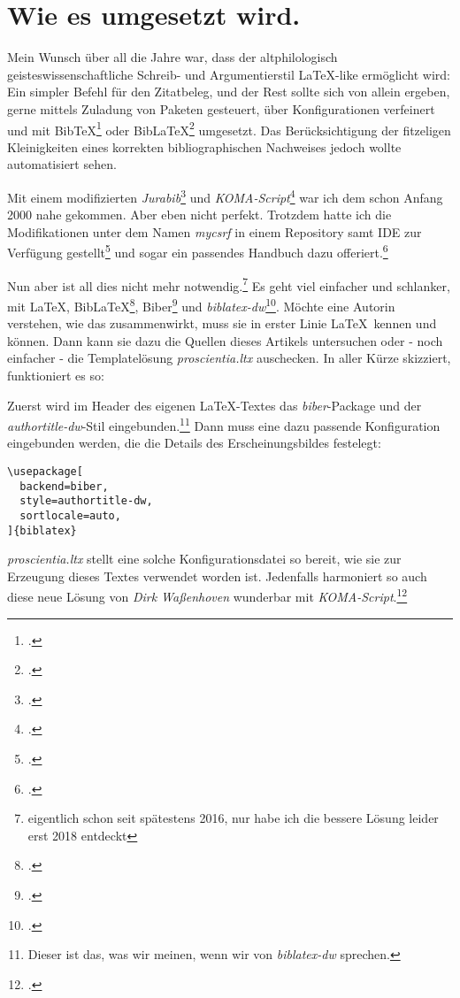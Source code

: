 \section{Wie es umgesetzt wird.}

Mein Wunsch über all die Jahre war, dass der altphilologisch geisteswissenschaftliche Schreib- und Argumentierstil \LaTeX-like ermöglicht wird: Ein simpler Befehl für den Zitatbeleg, und der Rest sollte sich von allein
ergeben, gerne mittels Zuladung von Paketen gesteuert, über Konfigurationen
verfeinert und mit Bib\TeX\footcite[vgl.][]{BibtexOrgDe} oder Bib\LaTeX\footcite[vgl.][]{BibLaTeX2022a} umgesetzt. Das Berücksichtigung der fitzeligen Kleinigkeiten eines korrekten bibliographischen Nachweises jedoch wollte automatisiert sehen.

Mit einem modifizierten \emph{Jurabib}\footcite[vgl.][]{Berger2004a} und \emph{KOMA-Script}\footcite[vgl.][]{Kohm2008a} war ich dem schon Anfang 2000 nahe gekommen. Aber eben nicht perfekt. Trotzdem hatte ich die Modifikationen unter dem Namen \emph{mycsrf} in einem Repository samt IDE zur Verfügung gestellt\footcite[vgl.][]{Reincke2021a} und sogar ein passendes Handbuch dazu offeriert.\footcite[vgl.][]{Reincke2018a}

Nun aber ist all dies nicht mehr notwendig.\footnote{eigentlich schon seit spätestens 2016, nur habe ich die bessere Lösung leider erst 2018 entdeckt} Es geht viel einfacher und schlanker, mit \LaTeX, Bib\LaTeX\footcite[vgl.][]{BibLaTeX2022a},  Biber\footcite[vgl.][]{Biber2022a} und \emph{biblatex-dw}\footcite[vgl.][]{Waßenhoven2016a}. Möchte eine Autorin verstehen, wie das zusammenwirkt, muss sie in erster Linie \LaTeX\ kennen und können. Dann kann sie dazu die Quellen dieses Artikels untersuchen oder - noch einfacher - die Templatelösung \emph{proscientia.ltx} auschecken. In aller Kürze skizziert, funktioniert es so:

Zuerst wird im Header des eigenen \LaTeX-Textes das \emph{biber}-Package und der \emph{authortitle-dw}-Stil eingebunden.\footnote{Dieser ist das, was wir meinen, wenn wir von \emph{biblatex-dw} sprechen.} Dann muss eine dazu passende Konfiguration eingebunden werden, die die Details des Erscheinungsbildes festelegt:

\small
\begin{verbatim}
\usepackage[
  backend=biber,
  style=authortitle-dw,
  sortlocale=auto,
]{biblatex}

\end{verbatim}
\small

\emph{proscientia.ltx} stellt eine solche Konfigurationsdatei so bereit, wie sie zur Erzeugung dieses Textes verwendet worden ist. Jedenfalls harmoniert so auch diese neue Lösung von \emph{Dirk Waßenhoven} wunderbar mit
\emph{KOMA-Script}.\footcite[vgl.][]{Kohm2008a}

